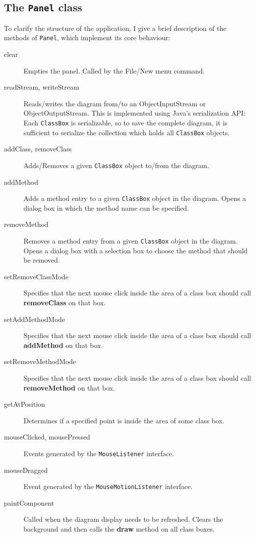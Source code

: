 \documentclass[11pt]{article}
\begin{document}
\subsection{The {\tt Panel} class}
To clarify the structure of the application, I give a brief description of
the methods of {\tt Panel}, which implement its core behaviour:

\begin{description}
\item[clear] Empties the panel. Called by the File/New menu command.
\item[readStream, writeStream] Reads/writes the diagram from/to an
    ObjectInputStream or ObjectOutputStream. This is implemented using
    Java's serialization API: Each {\tt ClassBox} is serializable, so to
    save the complete diagram, it is sufficient to serialize the collection
    which holds all {\tt ClassBox} objects.
\item[addClass, removeClass] Adds/Removes a given {\tt ClassBox} object to/from
    the diagram.
\item[addMethod] Adds a method entry to a given {\tt ClassBox} object in the
    diagram. Opens a dialog box in which the method name can be specified.
\item[removeMethod] Removes a method entry from a given {\tt ClassBox} object
    in the diagram. Opens a dialog box with a selection box to choose the
    method that should be removed.
\item[setRemoveClassMode] Specifies that the next mouse click inside the area
    of a class box should call {\bf removeClass} on that box.
\item[setAddMethodMode] Specifies that the next mouse click inside the area
    of a class box should call {\bf addMethod} on that box.
\item[setRemoveMethodMode] Specifies that the next mouse click inside the area
    of a class box should call {\bf removeMethod} on that box.
\item[getAtPosition] Determines if a specified point is inside the area of
    some class box.
\item[mouseClicked, mousePressed] Events generated by the {\tt MouseListener}
    interface.
\item[mouseDragged] Event generated by the {\tt MouseMotionListener} interface.
\item[paintComponent] Called when the diagram display needs to be refreshed.
    Clears the background and then calls the {\bf draw} method on all class
    boxes.
\end{description}
\end{document}
